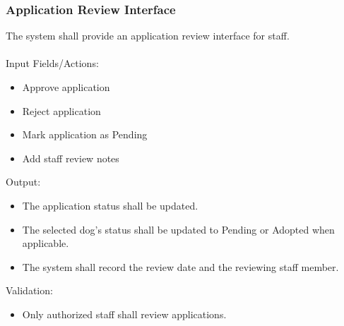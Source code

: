 \documentclass[12pt]{article}
\begin{document}
\subsubsection{Application Review Interface}
The system shall provide an application review interface for staff.
\\
\\
Input Fields/Actions:
\begin{itemize}\item Approve application\end{itemize}
\begin{itemize}\item Reject application\end{itemize}
\begin{itemize}\item Mark application as Pending\end{itemize}
\begin{itemize}\item Add staff review notes\end{itemize}
Output:
\begin{itemize}\item The application status shall be updated.\end{itemize}
\begin{itemize}\item The selected dog’s status shall be updated to Pending or Adopted when applicable.\end{itemize}
\begin{itemize}\item The system shall record the review date and the reviewing staff member.\end{itemize}
Validation:
\begin{itemize}\item Only authorized staff shall review applications.\end{itemize}
\end{document}
